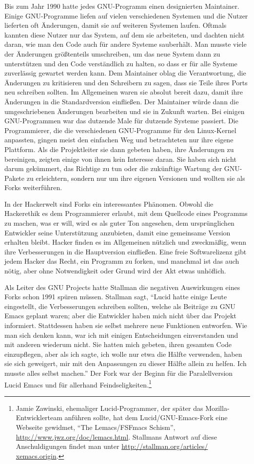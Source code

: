Bis zum Jahr 1990 hatte jedes GNU-Programm einen designierten Maintainer.
Einige GNU-Programme liefen auf vielen verschiedenen Systemen und die Nutzer lieferten oft Änderungen, damit sie auf weiteren Systemen laufen. Oftmals kannten diese Nutzer nur das System, auf dem sie arbeiteten, und dachten nicht daran, wie man den Code auch für andere Systeme sauberhält. Man musste viele der Änderungen größtenteils umschreiben, um das neue System dann zu unterstützen und den Code verständlich zu halten, so dass er für alle Systeme zuverlässig gewartet werden kann. Dem Maintainer oblag die Verantwortung, die Änderungen zu kritisieren und den Schreibern zu sagen, dass sie Teile ihres Ports neu schreiben sollten. Im Allgemeinen waren sie absolut bereit dazu, damit ihre Änderungen in die Standardversion einfließen. Der Maintainer würde dann die umgeschriebenen Änderungen bearbeiten und sie in Zukunft warten. Bei einigen GNU-Programmen war das dutzende Male für dutzende Systeme passiert.
Die Programmierer, die die verschiedenen GNU-Programme für den Linux-Kernel anpassten, gingen meist den einfachen Weg und betrachteten nur ihre eigene Plattform. Als die Projektleiter sie dann gebeten haben, ihre Änderungen zu bereinigen, zeigten einige von ihnen kein Interesse daran. Sie haben sich nicht darum gekümmert, das Richtige zu tun oder die zukünftige Wartung der GNU-Pakete zu erleichtern, sondern nur um ihre eigenen Versionen und wollten sie als Forks weiterführen.

In der Hackerwelt sind Forks ein interessantes Phänomen. Obwohl die Hackerethik es dem Programmierer erlaubt, mit dem Quellcode eines Programms zu machen, was er will, wird es als guter Ton angesehen, dem ursprünglichen Entwickler seine Unterstützung anzubieten, damit eine gemeinsame Version erhalten bleibt. Hacker finden es im Allgemeinen nützlich und zweckmäßig, wenn ihre Verbesserungen in die Hauptversion einfließen. Eine freie Softwarelizenz gibt jedem Hacker das Recht, ein Programm zu forken, und manchmal ist das auch nötig, aber ohne Notwendigkeit oder Grund wird der Akt etwas unhöflich.

Als Leiter des GNU Projects hatte Stallman die negativen Auswirkungen eines Forks schon 1991 spüren müssen. Stallman sagt, "`Lucid hatte einige Leute eingestellt, die Verbesserungen schreiben sollten, welche als Beiträge zu GNU Emacs geplant waren; aber die Entwickler haben mich nicht über das Projekt informiert. Stattdessen haben sie selbst mehrere neue Funktionen entworfen. Wie man sich denken kann, war ich mit einigen Entscheidungen einverstanden und mit anderen wiederum nicht. Sie hatten mich gebeten, ihren gesamten Code einzupflegen, aber als ich sagte, ich wolle nur etwa die Hälfte verwenden, haben sie sich geweigert, mir mit den Anpassungen zu dieser Hälfte allein zu helfen. Ich musste alles selbst machen."' Der Fork war der Beginn für die Paralellversion Lucid Emacs und für allerhand Feindseligkeiten.\footnote{Jamie Zawinski, ehemaliger Lucid-Programmer, der später das Mozilla-Entwicklerteam anführen sollte, hat dem Lucid/GNU-Emacs-Fork eine Webseite gewidmet, "`The Lemacs/FSFmacs Schism"',  \url{http://www.jwz.org/doc/lemacs.html}. Stallmans Antwort auf diese Anschuldigungen findet man unter \url{http://stallman.org/articles/
xemacs.origin}.}

